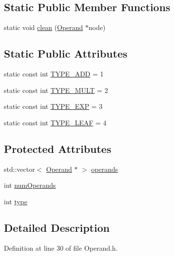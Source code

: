 \subsection*{Static Public Member Functions}
\begin{DoxyCompactItemize}
\item 
static void \hyperlink{class_operand_a690d7ad2b55003a28adf37aeaa658527}{clean} (\hyperlink{class_operand}{Operand} $\ast$node)
\end{DoxyCompactItemize}
\subsection*{Static Public Attributes}
\begin{DoxyCompactItemize}
\item 
static const int \hyperlink{class_operand_a72561b58147e35a5a359d9b79118dbb0}{T\+Y\+P\+E\+\_\+\+A\+D\+D} = 1
\item 
static const int \hyperlink{class_operand_a081453264453622326e975742d65bdc8}{T\+Y\+P\+E\+\_\+\+M\+U\+L\+T} = 2
\item 
static const int \hyperlink{class_operand_a16ab8a1b33c8e8a2f576a9027f7f2d21}{T\+Y\+P\+E\+\_\+\+E\+X\+P} = 3
\item 
static const int \hyperlink{class_operand_a9d9c7e7ff88c2ce280aa1332f9b12913}{T\+Y\+P\+E\+\_\+\+L\+E\+A\+F} = 4
\end{DoxyCompactItemize}
\subsection*{Protected Attributes}
\begin{DoxyCompactItemize}
\item 
std\+::vector$<$ \hyperlink{class_operand}{Operand} $\ast$ $>$ \hyperlink{class_operand_a7939bfe67bad92030551774aed8a1b77}{operands}
\item 
int \hyperlink{class_operand_a36baa86e6e7199ef596a647f180a8584}{num\+Operands}
\item 
int \hyperlink{class_operand_a389bb640b257a1fc4ed658a1817591c6}{type}
\end{DoxyCompactItemize}


\subsection{Detailed Description}


Definition at line 30 of file Operand.\+h.



